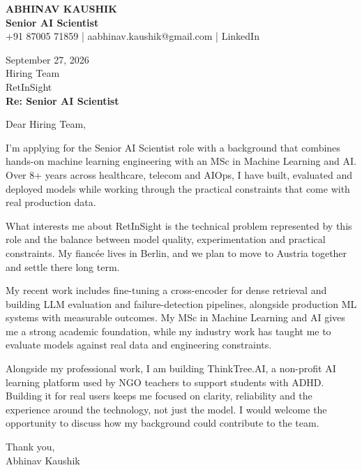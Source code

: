 \documentclass[10pt,a4paper]{article}
\begin{document}
\begin{center}
{\Large\bfseries ABHINAV KAUSHIK}\\[2pt]
{\bfseries Senior AI Scientist}\\[2pt]
+91 87005 71859 \quad | \quad aabhinav.kaushik@gmail.com \quad | \quad LinkedIn
\end{center}
\vspace{8pt}
September 27, 2026\\[6pt]
Hiring Team\\
RetInSight\\[4pt]
\textbf{Re: Senior AI Scientist}

Dear Hiring Team,

I’m applying for the Senior AI Scientist role with a background that combines hands-on machine learning engineering with an MSc in Machine Learning and AI. Over 8+ years across healthcare, telecom and AIOps, I have built, evaluated and deployed models while working through the practical constraints that come with real production data.

What interests me about RetInSight is the technical problem represented by this role and the balance between model quality, experimentation and practical constraints. My fiancée lives in Berlin, and we plan to move to Austria together and settle there long term.

My recent work includes fine-tuning a cross-encoder for dense retrieval and building LLM evaluation and failure-detection pipelines, alongside production ML systems with measurable outcomes. My MSc in Machine Learning and AI gives me a strong academic foundation, while my industry work has taught me to evaluate models against real data and engineering constraints.

Alongside my professional work, I am building ThinkTree.AI, a non-profit AI learning platform used by NGO teachers to support students with ADHD. Building it for real users keeps me focused on clarity, reliability and the experience around the technology, not just the model. I would welcome the opportunity to discuss how my background could contribute to the team.

Thank you,\\
Abhinav Kaushik
\end{document}
